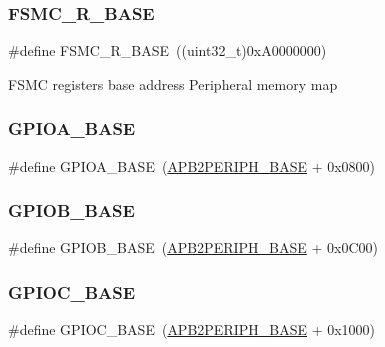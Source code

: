 \subsubsection{\texorpdfstring{FSMC\_R\_BASE}{FSMC\_R\_BASE}}
{\footnotesize\ttfamily \#define F\+S\+M\+C\+\_\+\+R\+\_\+\+B\+A\+SE~((uint32\+\_\+t)0x\+A0000000)}

F\+S\+MC registers base address Peripheral memory map \mbox{\label{group___peripheral__memory__map_gad7723846cc5db8e43a44d78cf21f6efa}} 
\subsubsection{\texorpdfstring{GPIOA\_BASE}{GPIOA\_BASE}}
{\footnotesize\ttfamily \#define G\+P\+I\+O\+A\+\_\+\+B\+A\+SE~(\mbox{\hyperlink{group___peripheral__memory__map_ga25b99d6065f1c8f751e78f43ade652cb}{A\+P\+B2\+P\+E\+R\+I\+P\+H\+\_\+\+B\+A\+SE}} + 0x0800)}

\mbox{\label{group___peripheral__memory__map_gac944a89eb789000ece920c0f89cb6a68}} 
\subsubsection{\texorpdfstring{GPIOB\_BASE}{GPIOB\_BASE}}
{\footnotesize\ttfamily \#define G\+P\+I\+O\+B\+\_\+\+B\+A\+SE~(\mbox{\hyperlink{group___peripheral__memory__map_ga25b99d6065f1c8f751e78f43ade652cb}{A\+P\+B2\+P\+E\+R\+I\+P\+H\+\_\+\+B\+A\+SE}} + 0x0\+C00)}

\mbox{\label{group___peripheral__memory__map_ga26f267dc35338eef219544c51f1e6b3f}} 
\subsubsection{\texorpdfstring{GPIOC\_BASE}{GPIOC\_BASE}}
{\footnotesize\ttfamily \#define G\+P\+I\+O\+C\+\_\+\+B\+A\+SE~(\mbox{\hyperlink{group___peripheral__memory__map_ga25b99d6065f1c8f751e78f43ade652cb}{A\+P\+B2\+P\+E\+R\+I\+P\+H\+\_\+\+B\+A\+SE}} + 0x1000)}

